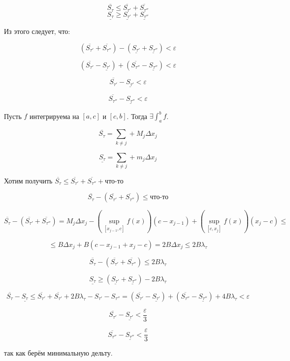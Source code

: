 \documentclass[a4paper]{article}
\begin{document}
\begin{definit}
\[
\overline{S_{\tau}} \leq \overline{S_{\tau'}} + \overline{S_{\tau''}}
\]
\[
\underline{S_{\tau}} \geq \underline{S_{\tau'}} + \underline{S_{\tau''}}
\]

Из этого следует, что:

\[
(\overline{S_{\tau'}} + \overline{S_{\tau''}} )- (\underline{S_{\tau'}} + \underline{S_{\tau''}}) < \varepsilon
\]

\[
(\overline{S_{\tau'}} - \underline{S_{\tau'}}) + (\overline{S_{\tau''}} - \underline{S_{\tau''}}) < \varepsilon
\]

\[
\overline{S_{\tau'}} - \underline{S_{\tau'}} < \varepsilon
\]

\[
\overline{S_{\tau''}} - \underline{S_{\tau''}} < \varepsilon
\]

Пусть $f$ интегрируема на $[a,c]$ и $[c,b]$. Тогда $\exists \int_a^b f$.

\[
\overline{S_\tau} = \sum_{k \neq j} + M_j \Delta x_j
\]

\[
\underline{S_\tau} = \sum_{k \neq j} + m_j \Delta x_j
\]

Хотим получить $\overline{S_\tau} \leq \overline{S_{\tau'}} + \overline{S_{\tau''}} + \text{что-то}$

\[
\overline{S_\tau} - (\overline{S_{\tau'}} + \overline{S_{\tau''}}) \leq \text{что-то}
\]

\[
\overline{S_\tau} - (\overline{S_{\tau'}} + \overline{S_{\tau''}}) = M_j \Delta x_j - \left( \sup_{[x_{j-1}, c]} f(x) \right) (c-x_{j-1}) + \left( \sup_{[c, x_j]} f(x) \right)(x_j-c) \leq
\]

\[
\leq B \Delta x_j + B (c-x_{j-1} + x_j -c) = 2B \Delta x_j \leq 2B \lambda_\tau
\] 

\[\overline{S_\tau} - (\overline{S_{\tau'}} + \overline{S_{\tau''}}) \leq 2B \lambda_\tau\]

\[\underline{S_\tau} \geq (\underline{S_{\tau'}} + \underline{S_{\tau''}}) - 2B \lambda_\tau\]

\[\overline{S_\tau} - \underline{S_\tau} \leq \overline{S_{\tau'}} + \overline{S_{\tau'}} + 2B \lambda_\tau - S_{\tau'} - S_{\tau''} = (\overline{S_{\tau'}} - \underline{S_{\tau'}}) + (\overline{S_{\tau''}} - \underline{S_{\tau''}}) + 4B\lambda_\tau < \varepsilon\]

\[
\overline{S_{\tau'}} - \underline{S_{\tau'}} < \frac{\varepsilon}{3}
\]

\[
\overline{S_{\tau''}} - \underline{S_{\tau''}} < \frac{\varepsilon}{3}
\]

так как берём минимальную дельту.


\end{definit}
\end{document}

